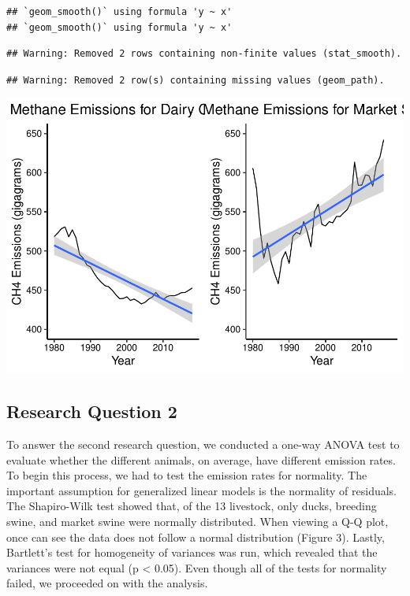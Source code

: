 \documentclass[
  12pt,
]{article}
\begin{document}
\begin{verbatim}
## `geom_smooth()` using formula 'y ~ x'
## `geom_smooth()` using formula 'y ~ x'
\end{verbatim}

\begin{verbatim}
## Warning: Removed 2 rows containing non-finite values (stat_smooth).
\end{verbatim}

\begin{verbatim}
## Warning: Removed 2 row(s) containing missing values (geom_path).
\end{verbatim}

\includegraphics{Methane_Project_Template_files/figure-latex/plot.grid-1.pdf}

\hypertarget{research-question-2}{%
\subsection{Research Question 2}\label{research-question-2}}

To answer the second research question, we conducted a one-way ANOVA
test to evaluate whether the different animals, on average, have
different emission rates. To begin this process, we had to test the
emission rates for normality. The important assumption for generalized
linear models is the normality of residuals. The Shapiro-Wilk test
showed that, of the 13 livestock, only ducks, breeding swine, and market
swine were normally distributed. When viewing a Q-Q plot, once can see
the data does not follow a normal distribution (Figure 3). Lastly,
Bartlett's test for homogeneity of variances was run, which revealed
that the variances were not equal (p \textless{} 0.05). Even though all
of the tests for normality failed, we proceeded on with the analysis.
\end{document}

